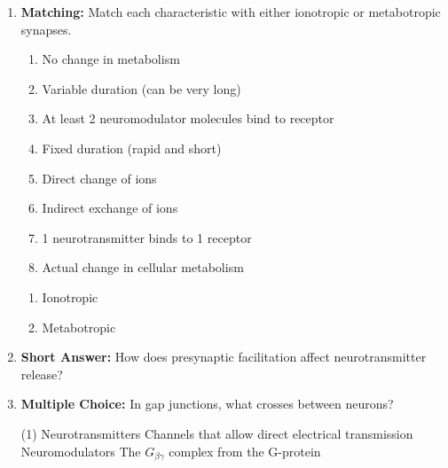 \begin{enumerate}[label=\textbf{Q2.5.\arabic*}]
      \item \textbf{Matching:} Match each characteristic with either ionotropic or metabotropic synapses.
            \begin{wordbox}
                  \begin{enumerate}[label=(\alph*)]
                        \item No change in metabolism
                        \item Variable duration (can be very long)
                        \item At least 2 neuromodulator molecules bind to receptor
                        \item Fixed duration (rapid and short)
                        \item Direct change of ions
                        \item Indirect exchange of ions
                        \item 1 neurotransmitter binds to 1 receptor
                        \item Actual change in cellular metabolism
                  \end{enumerate}
            \end{wordbox}
            \begin{enumerate}[label=(\arabic*)]
                  \item Ionotropic \quad \dotfill \quad \underline{\hspace{3cm}} \\ 
                  \item Metabotropic \quad \dotfill \quad \underline{\hspace{3cm}} \\
            \end{enumerate}
                        
      \item \textbf{Short Answer:} How does presynaptic facilitation affect neurotransmitter release? \\
            
      \item \textbf{Multiple Choice:} In gap junctions, what crosses between neurons?
            \begin{tasks}[label=\textcolor{\documentTheme}{(\Alph*)}, item-format=\color{\documentTheme}, label-width=1.5em, item-indent=1.7em](1)
                  \task Neurotransmitters
                  \task Channels that allow direct electrical transmission
                  \task Neuromodulators
                  \task The \(G_{\beta\gamma}\) complex from the G-protein
            \end{tasks}
            

\end{enumerate}
